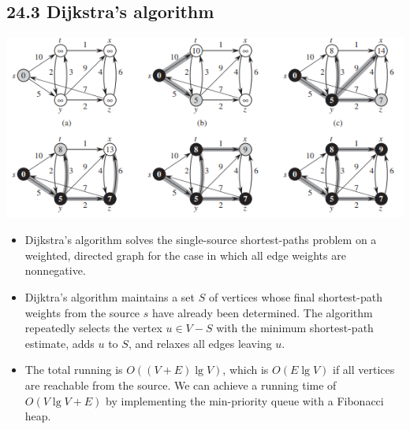 \documentclass{report}
\begin{document}
\subsection*{24.3 Dijkstra's algorithm}
\begin{center}
    \includegraphics[width = 8 cm]{../entities/dijkstra.png}
\end{center}
\begin{itemize}
    \item Dijkstra's algorithm solves the single-source shortest-paths problem on a weighted, directed graph for the case in which all edge weights are nonnegative.
    \item Dijktra's algorithm maintains a set $S$ of vertices whose final shortest-path weights from the source $s$ have already been determined. The algorithm repeatedly selects the vertex $u \in V - S$ with the minimum shortest-path estimate, adds $u$ to $S$, and relaxes all edges leaving $u$.
    \item The total running is $O((V + E) \lg V)$, which is $O(E \lg V)$ if all vertices are reachable from the source. We can achieve a running time of $O(V \lg V + E)$ by implementing the min-priority queue with a Fibonacci heap.
\end{itemize}
\end{document}
